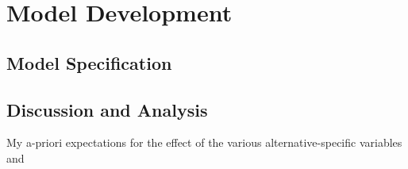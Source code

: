 \section{Model Development}
\subsection{Model Specification}
\subsection{Discussion and Analysis}
My a-priori expectations for the effect of the various alternative-specific variables and 